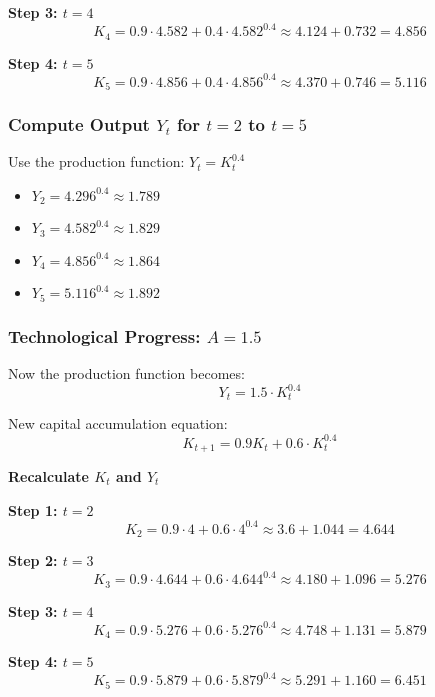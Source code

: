 \documentclass[
]{article}
\providecommand{\tightlist}{%
  \setlength{\itemsep}{0pt}\setlength{\parskip}{0pt}}
\begin{document}
\textbf{Step 3: \(t = 4\)}\\
\[
K_4 = 0.9 \cdot 4.582 + 0.4 \cdot 4.582^{0.4} \approx 4.124 + 0.732 = 4.856
\]

\textbf{Step 4: \(t = 5\)}\\
\[
K_5 = 0.9 \cdot 4.856 + 0.4 \cdot 4.856^{0.4} \approx 4.370 + 0.746 = 5.116
\]

\subsubsection{\texorpdfstring{Compute Output \(Y_t\) for \(t = 2\) to
\(t = 5\)}{Compute Output Y\_t for t = 2 to t = 5}}\label{compute-output-y_t-for-t-2-to-t-5}

Use the production function: \(Y_t = K_t^{0.4}\)

\begin{itemize}
\tightlist
\item
  \(Y_2 = 4.296^{0.4} \approx 1.789\)
\item
  \(Y_3 = 4.582^{0.4} \approx 1.829\)
\item
  \(Y_4 = 4.856^{0.4} \approx 1.864\)
\item
  \(Y_5 = 5.116^{0.4} \approx 1.892\)
\end{itemize}

\subsubsection{\texorpdfstring{Technological Progress:
\(A = 1.5\)}{Technological Progress: A = 1.5}}\label{technological-progress-a-1.5}

Now the production function becomes:\\
\[
Y_t = 1.5 \cdot K_t^{0.4}
\]

New capital accumulation equation: \[
K_{t+1} = 0.9K_t + 0.6 \cdot K_t^{0.4}
\]

\textbf{Recalculate \(K_t\) and \(Y_t\)}

\textbf{Step 1: \(t = 2\)}\\
\[
K_2 = 0.9 \cdot 4 + 0.6 \cdot 4^{0.4} \approx 3.6 + 1.044 = 4.644
\]

\textbf{Step 2: \(t = 3\)}\\
\[
K_3 = 0.9 \cdot 4.644 + 0.6 \cdot 4.644^{0.4} \approx 4.180 + 1.096 = 5.276
\]

\textbf{Step 3: \(t = 4\)}\\
\[
K_4 = 0.9 \cdot 5.276 + 0.6 \cdot 5.276^{0.4} \approx 4.748 + 1.131 = 5.879
\]

\textbf{Step 4: \(t = 5\)}\\
\[
K_5 = 0.9 \cdot 5.879 + 0.6 \cdot 5.879^{0.4} \approx 5.291 + 1.160 = 6.451
\]
\end{document}
